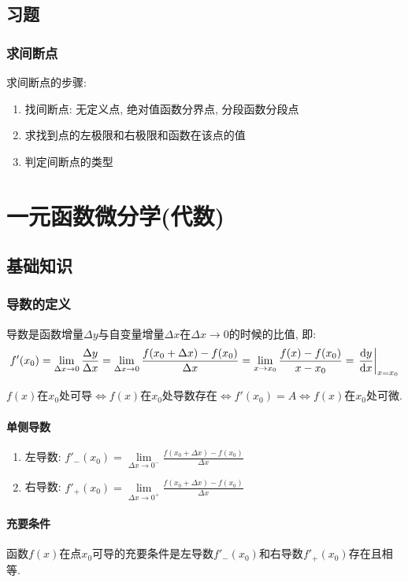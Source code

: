 \section{习题}
\subsection{求间断点}
求间断点的步骤:
\begin{enumerate}
\item 找间断点: 无定义点, 绝对值函数分界点, 分段函数分段点
\item 求找到点的左极限和右极限和函数在该点的值
\item 判定间断点的类型
\end{enumerate}
\chapter{一元函数微分学(代数)}
\section{基础知识}
\subsection{导数的定义}
导数是函数增量$ \Delta y $与自变量增量$ \Delta x $在$ \Delta x \rightarrow 0 $的时候的比值, 即:
\begin{equation*}
f'(x_{0})=\lim\limits_{\Delta x\rightarrow 0}\frac{\Delta y}{\Delta x}=\lim\limits_{\Delta x\rightarrow 0}\frac{f(x_{0}+\Delta x)-f(x_{0})}{\Delta x}=\lim\limits_{x\rightarrow x_{0}}\frac{f(x)-f(x_{0})}{x-x_{0}}=\left.\dv{y}{x}\right|_{x=x_{0}}
\end{equation*}\par 
$ f(x) $在$ x_{0} $处可导$ \Leftrightarrow f(x)$在$ x_{0} $处导数存在$ \Leftrightarrow f'(x_{0})=A \Leftrightarrow f(x) $在$ x_{0} $处可微.
\subsubsection{单侧导数}
\begin{enumerate}
\item 左导数: $ f'_{-}(x_{0})=\lim\limits_{\Delta x\rightarrow 0^{-}}\frac{f(x_{0}+\Delta x)-f(x_{0})}{\Delta x} $
\item 右导数: $ f'_{+}(x_{0})=\lim\limits_{\Delta x\rightarrow 0^{+}}\frac{f(x_{0}+\Delta x)-f(x_{0})}{\Delta x} $
\end{enumerate}
\subsubsection{充要条件}
函数$ f(x) $在点$ x_{0} $可导的充要条件是左导数$ f'_{-}(x_{0}) $和右导数$ f'_{+}(x_{0}) $存在且相等.
